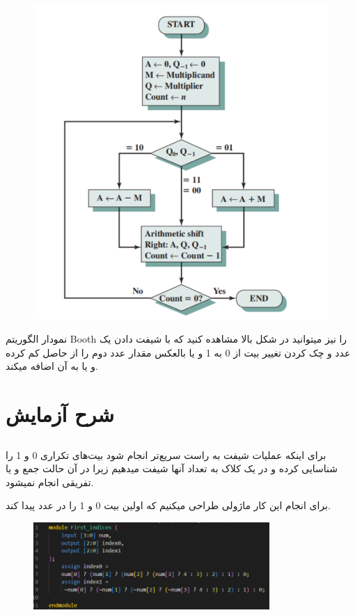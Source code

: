 \documentclass{article}
\begin{document}
\begin{figure}[H]
    \centering
    \includegraphics[width=\textwidth]{BF.png}
\end{figure}

نمودار الگوریتم 
Booth 
را نیز میتوانید در شکل بالا مشاهده کنید 
که با شیفت دادن یک عدد و چک کردن تغییر بیت از 0 به 1 و یا بالعکس مقدار عدد
دوم را از حاصل کم کرده و یا به آن اضافه میکند.

\section{شرح آزمایش}

\subsection{}
برای اینکه عملیات شیفت به راست سریع‌تر انجام شود بیت‌های تکراری 
0 و 1 را شناسایی کرده و در یک کلاک به تعداد آنها شیفت میدهیم زیرا
در آن حالت جمع و یا تفریقی انجام نمیشود.

برای انجام این کار ماژولی طراحی میکنیم که اولین بیت 0 و 1 را در عدد پیدا کند.

\begin{figure}[H]
    \centering
    \includegraphics[width=0.8\textwidth]{FI.png}
\end{figure}
\end{document}
